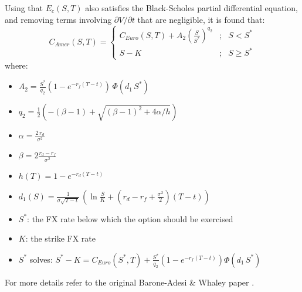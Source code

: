 Using that $E_c (S,T)$ also satisfies the Black-Scholes partial differential equation, 
and removing terms involving $\partial V / \partial t$ that are negligible, it is found 
that:
$$
C_{Amer} (S,T)=\left\{ \begin{array}{lcl}
C_{Euro}(S,T) + A_2\left(\frac{S}{S^*}\right)^{q_2} &;& S < S^*\\
S-K &;& S\geq S^* 
\end{array}
\right.
$$
where:
\begin{itemize}
\item $\displaystyle A_2=\frac{S^*}{q_2} \left(1-e^{-r_f (T-t)}\right)\,\Phi(d_1\,S^*)$
\item $\displaystyle q_2=\frac{1}{2}\left(-(\beta-1)+\sqrt{(\beta-1)^2+4\alpha/h}\right)$
\item $\displaystyle \alpha =\frac{2\,r_d}{\sigma^2}$ 
\item $\displaystyle \beta=2\frac{r_d-r_f}{\sigma^2}$ 
\item $\displaystyle h(T)=1-e^{-r_d (T-t)}$
\item $\displaystyle d_1(S)=\frac{1}{\sigma\sqrt{T-t}}\,
	\left(\ln\frac{S}{K}+\left(r_d - r_f + \frac{\sigma^2}{2}\right)(T-t)\right)$
\item $S^*$: the FX rate below which the option should be exercised
\item $K$: the strike FX rate
\item $S^*$ solves:
$\displaystyle S^*-K = C_{Euro}(S^*,T) + \frac{S^*}{q_2}  \left(1-e^{-r_f (T-t)}\right) \Phi(d_1 \,S^*)$
\end{itemize}

For more details refer to the original Barone-Adesi \& Whaley paper \cite{Barone-Adesi_1987}.

